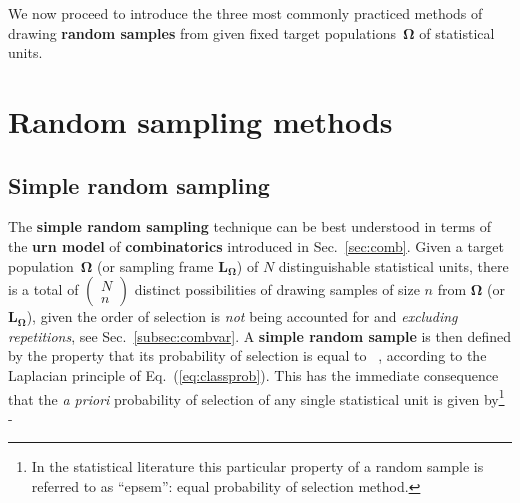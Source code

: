 \medskip
\noindent
We now proceed to introduce the three most commonly practiced 
methods of drawing \textbf{random samples} from given fixed target
populations~$\boldsymbol{\Omega}$ of statistical units.

\section[Random sampling methods]{Random sampling methods}
\subsection[Simple random sampling]{Simple random sampling}
The \textbf{simple random sampling} technique can be best
understood in terms of the \textbf{urn model} of
\textbf{combinatorics} introduced in Sec.~\ref{sec:comb}. Given a
target population~$\boldsymbol{\Omega}$ (or sampling frame 
$\boldsymbol{L_{\Omega}}$) of $N$ distinguishable statistical 
units, there is a total of $\left(\begin{array}{c} N \\ n 
\end{array}\right)$ distinct possibilities of drawing samples of 
size $n$ from $\boldsymbol{\Omega}$ (or 
$\boldsymbol{L_{\Omega}}$), given the order of selection is 
\textit{not} being accounted for and \textit{excluding
repetitions}, see Sec.~\ref{subsec:combvar}. A \textbf{simple
random sample} is then defined by the property that its
probability of selection is equal to
%
\be
{} \ ,
\ee
%
according to the Laplacian principle of Eq.~(\ref{eq:classprob}). 
This has the immediate consequence that the \textit{a priori} 
probability of selection of any single statistical unit is given 
by\footnote{In the statistical literature this particular property 
of a random sample is referred to as ``epsem'': equal probability 
of selection method.}
%
 - 
